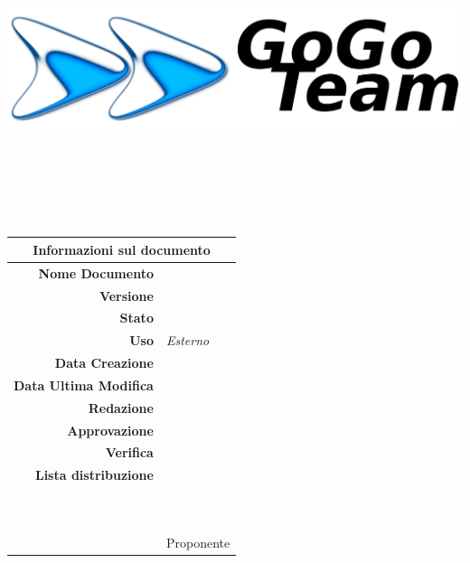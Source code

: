 \thispagestyle{empty}

\begin{titlepage}

\begin{center}
	\dataUM\\	
	\vspace{2cm}
	
	\includegraphics[scale=0.75]{../imgs/gogoTeamLogo.png}
	
	\vspace{2cm}
	
\HRule \\[0.4cm]
	\begin{Huge}
		{\huge \bfseries \titoloDocumento}\\[0.4cm]
	\end{Huge}
\HRule \\[2.5cm]
	
	\vfill

\begin{table}[h]
\begin{center}
\begin{tabular}{r | l}
\multicolumn{2}{c}{\textbf{Informazioni sul documento}}\\
\midrule
\textbf{Nome Documento}	&	\titoloDocumento	\\
\textbf{Versione}	&	\versione	\\
\textbf{Stato}	&	\emph{\stato}	\\
\textbf{Uso}	&	\emph{Esterno}	\\
\textbf{Data Creazione}	&	\dataCreazione	\\
\textbf{Data Ultima Modifica}	&	\dataUM	\\
\textbf{Redazione}	&	\SL\\
\textbf{Approvazione}	&	\MB\\
\textbf{Verifica}	&	\DC\\
\textbf{Lista distribuzione}	&	\emph{\ggt} 	\\
\ 	&	\Vardanega	\\
\ 	&	\Cardin	\\
\ 	&	Proponente \Zucchetti	\\

\end{tabular}
\end{center}
\end{table}

\end{center}

\end{titlepage}